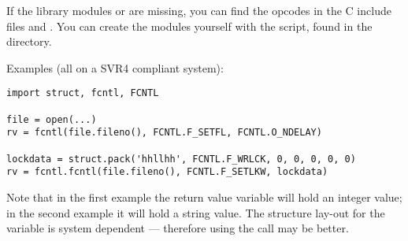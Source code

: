 If the library modules  or
 are missing, you can find the
opcodes in the C include files  and
.  You can create the modules yourself with the
 script, found in the  directory.


Examples (all on a SVR4 compliant system):

\begin{verbatim}
import struct, fcntl, FCNTL

file = open(...)
rv = fcntl(file.fileno(), FCNTL.F_SETFL, FCNTL.O_NDELAY)

lockdata = struct.pack('hhllhh', FCNTL.F_WRLCK, 0, 0, 0, 0, 0)
rv = fcntl.fcntl(file.fileno(), FCNTL.F_SETLKW, lockdata)
\end{verbatim}

Note that in the first example the return value variable  will
hold an integer value; in the second example it will hold a string
value.  The structure lay-out for the  variable is
system dependent --- therefore using the  call may be
better.
